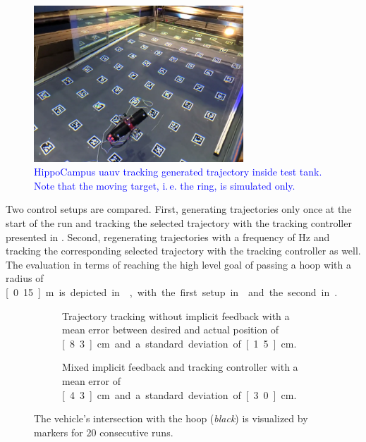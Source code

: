\begin{figure}
    \centering
    \includegraphics[width=0.7\textwidth]{images/04/hippo_in_tank.png}
    \caption{\textcolor{blue}{HippoCampus \ac{uauv} tracking generated trajectory inside test tank. Note that the moving target, i.\,e. the ring, is simulated only.}}
    \label{fig:hippo_in_tank}
\end{figure}
Two control setups are compared. First, generating trajectories only once at the start of the run and tracking the selected trajectory with the tracking controller presented in . Second, regenerating trajectories with a frequency of \unit[2]{Hz} and tracking the corresponding selected trajectory with the tracking controller as well. The evaluation in terms of reaching the high level goal of passing a hoop with a radius of \unit[0.15]{m} is depicted in , with the first setup in  and the second in .
\begin{figure}
	\centering
 \begin{subfigure}[t]{0.49\textwidth}
		\centering
		
     \caption{Trajectory tracking without implicit feedback with a mean error between desired and actual position of \unit[8.3]{cm} and a standard deviation of \unit[1.5]{cm}.}
     \label{fig:hoop-experiment-without-replanning}
 \end{subfigure}
    \begin{subfigure}[t]{0.49\textwidth}
		\centering
		
        \caption{Mixed implicit feedback and tracking controller with a mean error of \unit[4.3]{cm} and a standard deviation of \unit[3.0]{cm}.}
        \label{fig:hoop-experiment-with-replanning}
    \end{subfigure}
    \caption{The vehicle's intersection with the hoop (\emph{black}) is visualized by markers for 20 consecutive runs. }
    \label{fig:hoop-experiment}
\end{figure}
